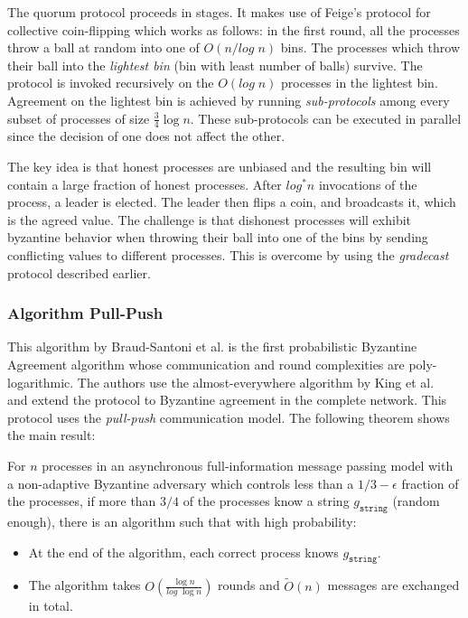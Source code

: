 The quorum protocol proceeds in stages. It makes use of Feige's protocol \cite{Feige99} for collective coin-flipping which works as follows: in the first round, all the processes throw a ball at random into one of $O(n/log\;n)$ bins. The processes which throw their ball into the \textit{lightest bin} (bin with least number of balls) survive. The protocol is invoked recursively on the $O(log\;n)$ processes in the lightest bin. Agreement on the lightest bin is achieved by running \textit{sub-protocols} among every subset of processes of size $\frac{3}{4}\log n$. These sub-protocols can be executed in parallel since the decision of one does not affect the other.

The key idea is that honest processes are unbiased and the resulting bin will contain a large fraction of honest processes. After $log^* n$ invocations of the process, a leader is elected. The leader then flips a coin, and broadcasts it, which is the agreed value. The challenge is that dishonest processes will exhibit byzantine behavior when throwing their ball into one of the bins by sending conflicting values to different processes. This is overcome by using the \textit{gradecast} protocol described earlier. 

\subsubsection{Algorithm Pull-Push \cite{BGH13}}
This algorithm by Braud-Santoni et al. \cite{BGH13} is the first probabilistic Byzantine Agreement algorithm whose communication and round complexities are poly-logarithmic. The authors use the almost-everywhere algorithm by King et al.~\cite{KSSV06} and extend the protocol to Byzantine agreement in the complete network. This protocol uses the \textit{pull-push} communication model. The following theorem shows the main result: 


\begin{theorem}
For $n$ processes in an asynchronous full-information message passing model with a non-adaptive Byzantine adversary which controls less than a $1/3 - \epsilon$ fraction of the processes, if more than $3/4$ of the processes know a string $g_{\mathtt{string}}$ (random enough), there is an algorithm such that with high probability:
\begin{itemize}
\item At the end of the algorithm, each correct process knows $g_{\mathtt{string}}$.
\item The algorithm takes $O(\frac{\log n}{log \; \log n})$ rounds and $\tilde{O}(n)$ messages are exchanged in total. 
\hfill\qedsymbol
\end{itemize}
\end{theorem}

